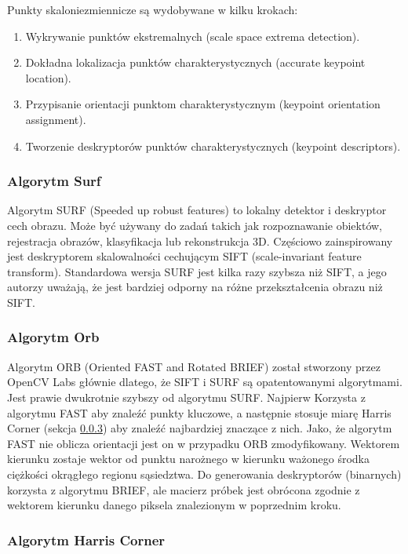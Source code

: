 \documentclass[12pt, notitlepage]{article}
\begin{document}
Punkty skaloniezmiennicze są wydobywane w kilku krokach:
\begin{enumerate}
    \item Wykrywanie punktów ekstremalnych (scale space extrema detection).
    \item Dokładna lokalizacja punktów charakterystycznych (accurate keypoint location).
    \item Przypisanie orientacji punktom charakterystycznym (keypoint orientation assignment).
    \item Tworzenie deskryptorów punktów charakterystycznych (keypoint descriptors).
\end{enumerate}

\subsubsection{Algorytm Surf}

Algorytm SURF (Speeded up robust features) to lokalny detektor i deskryptor cech obrazu. Może być używany do zadań takich jak rozpoznawanie obiektów, rejestracja obrazów, klasyfikacja lub rekonstrukcja 3D. Częściowo zainspirowany jest deskryptorem skalowalności cechującym SIFT (scale-invariant feature transform). Standardowa wersja SURF jest kilka razy szybsza niż SIFT, a jego autorzy uważają, że jest bardziej odporny na różne przekształcenia obrazu niż SIFT.

\subsubsection{Algorytm Orb}

Algorytm ORB (Oriented FAST and Rotated BRIEF) został stworzony przez OpenCV Labs głównie dlatego, że SIFT i SURF są opatentowanymi algorytmami. Jest prawie dwukrotnie szybszy od algorytmu SURF. Najpierw Korzysta z algorytmu FAST\cite{fast} aby znaleźć punkty kluczowe, a następnie stosuje miarę Harris Corner (sekcja \ref{sec:harris}) aby znaleźć najbardziej znaczące z nich. Jako, że algorytm FAST nie oblicza orientacji jest on w przypadku ORB zmodyfikowany. Wektorem kierunku zostaje wektor od punktu narożnego w kierunku ważonego środka ciężkości okrągłego regionu sąsiedztwa. Do generowania deskryptorów (binarnych) korzysta z algorytmu BRIEF\cite{brief}, ale macierz próbek jest obrócona zgodnie z wektorem kierunku danego piksela znalezionym w poprzednim kroku.

\subsubsection{Algorytm Harris Corner} \label{sec:harris}
\end{document}
